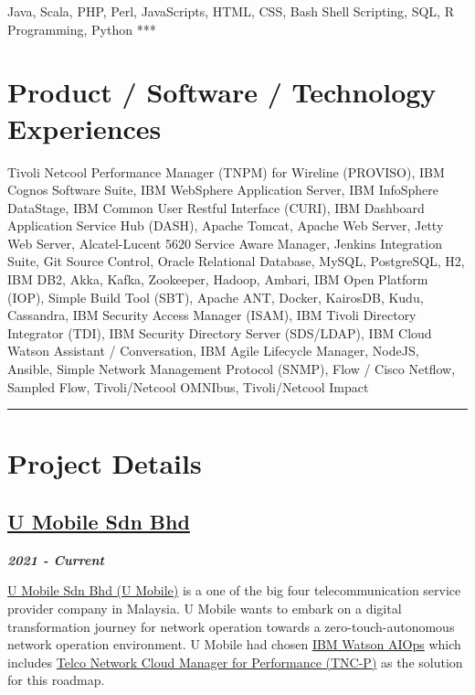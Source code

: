 \documentclass[
]{article}
\begin{document}
Java, Scala, PHP, Perl, JavaScripts, HTML, CSS, Bash Shell Scripting,
SQL, R Programming, Python ***

\hypertarget{product-software-technology-experiences}{%
\section{Product / Software / Technology
Experiences}\label{product-software-technology-experiences}}

Tivoli Netcool Performance Manager (TNPM) for Wireline (PROVISO), IBM
Cognos Software Suite, IBM WebSphere Application Server, IBM InfoSphere
DataStage, IBM Common User Restful Interface (CURI), IBM Dashboard
Application Service Hub (DASH), Apache Tomcat, Apache Web Server, Jetty
Web Server, Alcatel-Lucent 5620 Service Aware Manager, Jenkins
Integration Suite, Git Source Control, Oracle Relational Database,
MySQL, PostgreSQL, H2, IBM DB2, Akka, Kafka, Zookeeper, Hadoop, Ambari,
IBM Open Platform (IOP), Simple Build Tool (SBT), Apache ANT, Docker,
KairosDB, Kudu, Cassandra, IBM Security Access Manager (ISAM), IBM
Tivoli Directory Integrator (TDI), IBM Security Directory Server
(SDS/LDAP), IBM Cloud Watson Assistant / Conversation, IBM Agile
Lifecycle Manager, NodeJS, Ansible, Simple Network Management Protocol
(SNMP), Flow / Cisco Netflow, Sampled Flow, Tivoli/Netcool OMNIbus,
Tivoli/Netcool Impact

\begin{center}\rule{0.5\linewidth}{0.5pt}\end{center}

\hypertarget{project-details}{%
\section{Project Details}\label{project-details}}

\hypertarget{u-mobile-sdn-bhd}{%
\subsection{\texorpdfstring{\href{https://www.u.com.my/}{U Mobile Sdn
Bhd}}{U Mobile Sdn Bhd}}\label{u-mobile-sdn-bhd}}

\textbf{\emph{2021 - Current}}

\href{https://www.u.com.my/}{U Mobile Sdn Bhd (U Mobile)} is a one of
the big four telecommunication service provider company in Malaysia. U
Mobile wants to embark on a digital transformation journey for network
operation towards a zero-touch-autonomous network operation environment.
U Mobile had chosen
\href{https://www.ibm.com/watson/aiops-overview/}{IBM Watson AIOps}
which includes \href{https://www.ibm.com/docs/en/tncm-p/1.4.2}{Telco
Network Cloud Manager for Performance (TNC-P)} as the solution for this
roadmap.
\end{document}

